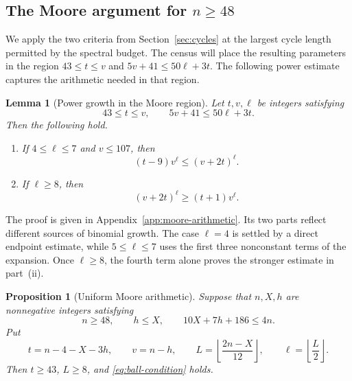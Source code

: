 \documentclass[11pt]{article}
\numberwithin{equation}{section}
\newtheorem{lemma}[theorem]{Lemma}
\newtheorem{proposition}[theorem]{Proposition}
\theoremstyle{definition}
\theoremstyle{remark}
\begin{document}
\subsection{The Moore argument for \texorpdfstring{\(n\ge48\)}{n >= 48}}

We apply the two criteria from Section~\ref{sec:cycles} at the largest cycle
length permitted by the spectral budget.  The census will place the resulting
parameters in the region
\(43\le t\le v\) and \(5v+41\le50\ell+3t\).  The following power estimate
captures the arithmetic needed in that region.

\begin{lemma}[Power growth in the Moore region]\label{lem:moore-power-growth}
Let \(t,v,\ell\) be integers satisfying
\[
 43\le t\le v,
 \qquad 5v+41\le50\ell+3t.
\]
Then the following hold.
\begin{enumerate}[label=\textup{(\roman*)}]
\item If \(4\le\ell\le7\) and \(v\le107\), then
\begin{equation}\label{eq:small-exponent-power}
 (t-9)v^\ell\le(v+2t)^\ell.
\end{equation}
\item If \(\ell\ge8\), then
\begin{equation}\label{eq:large-exponent-power}
 (v+2t)^\ell\ge(t+1)v^\ell.
\end{equation}
\end{enumerate}
\end{lemma}

The proof is given in Appendix~\ref{app:moore-arithmetic}.  Its two parts
reflect different sources of binomial growth.  The case \(\ell=4\) is settled
by a direct endpoint estimate, while \(5\le\ell\le7\) uses the first three
nonconstant terms of the expansion.  Once \(\ell\ge8\), the fourth term alone
proves the stronger estimate in part~\textup{(ii)}.

\begin{proposition}[Uniform Moore arithmetic]\label{prop:moore-arithmetic}
Suppose that \(n,X,h\) are nonnegative integers satisfying
\[
 n\ge48,
 \qquad h\le X,
 \qquad 10X+7h+186\le4n.
\]
Put
\[
 t=n-4-X-3h,\qquad v=n-h,\qquad
 L=\left\lfloor\frac{2n-X}{12}\right\rfloor,\qquad
 \ell=\left\lfloor\frac L2\right\rfloor.
\]
Then \(t\ge43\), \(L\ge8\), and \eqref{eq:ball-condition} holds.
\end{proposition}
\end{document}
